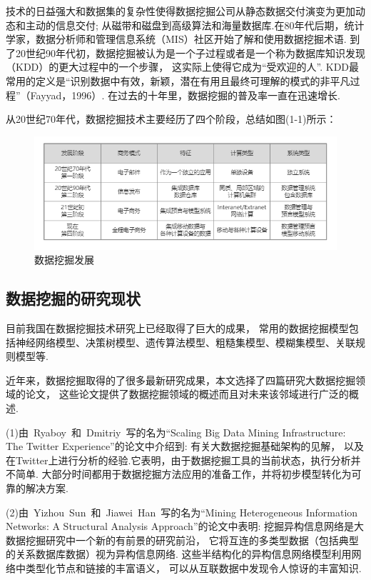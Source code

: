 \documentclass[bachelor,adobefonts]{jnuthesis}
\begin{document}
技术的日益强大和数据集的复杂性使得数据挖掘公司从静态数据交付演变为更加动态和主动的信息交付;
从磁带和磁盘到高级算法和海量数据库.在80年代后期，统计学家，数据分析师和管理信息系统（MIS）社区开始了解和使用数据挖掘术语.
到了20世纪90年代初，数据挖掘被认为是一个子过程或者是一个称为数据库知识发现（KDD）的更大过程中的一个步骤， 这实际上使得它成为“受欢迎的人”.
 KDD最常用的定义是“识别数据中有效，新颖，潜在有用且最终可理解的模式的非平凡过程”（Fayyad，1996）\cite{Feyyad1996Fayyad}.
在过去的十年里，数据挖掘的普及率一直在迅速增长.

从20世纪70年代，数据挖掘技术主要经历了四个阶段，总结如图(1-1)所示：

\begin{figure}[htp]
  \centering
  \includegraphics[width=1.0\linewidth]{Wsjwj.png}
  \caption{数据挖掘发展}
\end{figure}


\subsection{数据挖掘的研究现状}
目前我国在数据挖掘技术研究上已经取得了巨大的成果，
常用的数据挖掘模型包括神经网络模型、决策树模型、遗传算法模型、粗糙集模型、模糊集模型、关联规则模型等\cite{任新社2016关于数据挖掘研究现状及发展趋势的探究}.

近年来，数据挖掘取得的了很多最新研究成果，本文选择了四篇研究大数据挖掘领域的论文，
这些论文提供了数据挖掘领域的概述而且对未来该邻域进行广泛的概述.


(1)由\ Ryaboy\ 和\ Dmitriy\ 写的名为“Scaling Big Data Mining Infrastructure: The Twitter Experience”\cite{Ryaboy2013Scaling}的论文中介绍到:
有关大数据挖掘基础架构的见解，
以及在Twitter上进行分析的经验.它表明，由于数据挖掘工具的当前状态，执行分析并不简单.
大部分时间都用于数据挖掘方法应用的准备工作，并将初步模型转化为可靠的解决方案.

(2)由\ Yizhou\ Sun\  和\ Jiawei\ Han\ 写的名为“Mining Heterogeneous Information Networks: A
Structural Analysis Approach”\cite{Sun2012Mining}的论文中表明:
挖掘异构信息网络是大数据挖掘研究中一个新的有前景的研究前沿，
它将互连的多类型数据（包括典型的关系数据库数据）视为异构信息网络.
这些半结构化的异构信息网络模型利用网络中类型化节点和链接的丰富语义，
可以从互联数据中发现令人惊讶的丰富知识.
\end{document}
